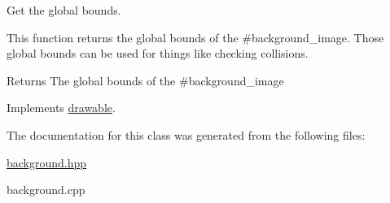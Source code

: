 Get the global bounds. 

This function returns the global bounds of the \#background\+\_\+image. Those global bounds can be used for things like checking collisions. \begin{DoxyReturn}{Returns}
The global bounds of the \#background\+\_\+image 
\end{DoxyReturn}


Implements \hyperlink{classdrawable_ae013ac0be47538be9ce885d6642daf73}{drawable}.



The documentation for this class was generated from the following files\+:\begin{DoxyCompactItemize}
\item 
\hyperlink{background_8hpp}{background.\+hpp}\item 
background.\+cpp\end{DoxyCompactItemize}
